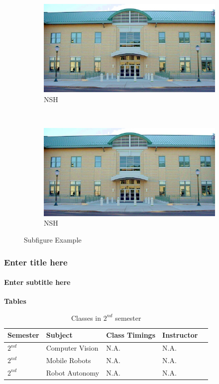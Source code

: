 \documentclass[11pt]{beamer}
\begin{document}
\begin{frame}
\begin{figure}[t!]
    \centering
    \begin{subfigure}[t]{0.5\textwidth}
        \centering
        \includegraphics[scale=.1]{images/nsh.jpg}
        \caption{NSH}
        \label{caption3}
    \end{subfigure}%
    ~
    \begin{subfigure}[t]{0.5\textwidth}
        \centering
        \includegraphics[scale=.1]{images/nsh.jpg}
        \caption{NSH}
        \label{caption4}
    \end{subfigure}%
    
    \caption{Subfigure Example}  
    \label{subfigure} 
\end{figure}

\end{frame}

\begin{frame}
\frametitle{Enter title here}
\framesubtitle{Enter subtitle here}

\textbf{Tables} \\

\begin{table}[h]
\caption{Classes in $2^{nd}$ semester}
\label{ingre}

\begin{tabularx}{\textwidth}{|l|X|X|X|X|}
\hline
\textbf{Semester} & \textbf{Subject} & \textbf{Class Timings} & \textbf{Instructor}\\
\hline
$2^{nd}$ & Computer Vision & N.A. & N.A.\\
\hline
$2^{nd}$ & Mobile Robots & N.A. & N.A.\\
\hline
$2^{nd}$ & Robot Autonomy & N.A. & N.A.\\
\hline
\end{tabularx}
\end{table}

\end{frame}
\end{document}
